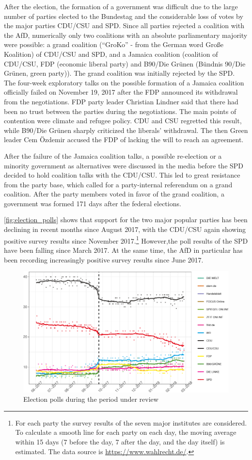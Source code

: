 \documentclass[
]{article}
\begin{document}
After the election, the formation of a government was difficult due to
the large number of parties elected to the Bundestag and the
considerable loss of votes by the major parties CDU/CSU and SPD. Since
all parties rejected a coalition with the AfD, numerically only two
coalitions with an absolute parliamentary majority were possible: a
grand coalition (``GroKo'' - from the German word Große Koalition) of
CDU/CSU and SPD, and a Jamaica coalition (coalition of CDU/CSU, FDP
(economic liberal party) and B90/Die Grünen (Bündnis 90/Die Grünen,
green party)). The grand coalition was initially rejected by the SPD.
The four-week exploratory talks on the possible formation of a Jamaica
coalition officially failed on November 19, 2017 after the FDP announced
its withdrawal from the negotiations. FDP party leader Christian Lindner
said that there had been no trust between the parties during the
negotiations. The main points of contention were climate and refugee
policy. CDU and CSU regretted this result, while B90/Die Grünen sharply
criticized the liberals' withdrawal. The then Green leader Cem Özdemir
accused the FDP of lacking the will to reach an agreement.

After the failure of the Jamaica coalition talks, a possible re-election
or a minority government as alternatives were discussed in the media
before the SPD decided to hold coalition talks with the CDU/CSU. This
led to great resistance from the party base, which called for a
party-internal referendum on a grand coalition. After the party members
voted in favor of the grand coalition, a government was formed 171 days
after the federal elections.

\autoref{fig:election_polls} shows that support for the two major
popular parties has been declining in recent months since August 2017,
with the CDU/CSU again showing positive survey results since November
2017.\footnote{For each party the survey results of the seven major
  institutes are considered. To calculate a smooth line for each party
  on each day, the moving average within 15 days (7 before the day, 7
  after the day, and the day itself) is estimated. The data source is
  \url{https://www.wahlrecht.de/}.} However,the poll results of the SPD
have been falling since March 2017. At the same time, the AfD in
particular has been recording increasingly positive survey results since
June 2017.

\begin{figure}

{\centering \includegraphics[width=0.5\linewidth]{main_text_files/figure-latex/election polls-1} 

}

\caption{Election polls during the period under review \label{fig:election_polls}}\label{fig:election polls}
\end{figure}
\end{document}
